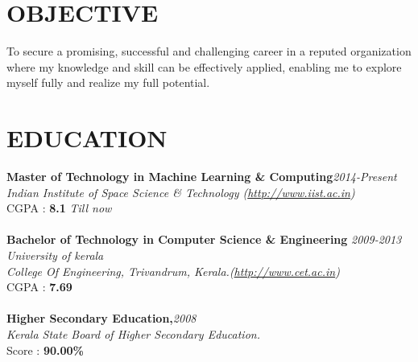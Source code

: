\documentclass[line,margin]{res}
\begin{document}
\address{\large akhilpm135@gmail.com}
\address{\large (+91) 9961558915}

\thispagestyle{empty} %

\begin{resume}
  
  	\section{OBJECTIVE}       
  		To secure a promising, successful and challenging career in a reputed organization where my knowledge and skill can be effectively applied, enabling me to explore myself fully and realize my full potential.
  
  	\section{EDUCATION} 
        {\bf Master of Technology in Machine Learning \& Computing}\hfill {\it 2014-Present}\\
        {\it Indian Institute of Space Science \& Technology \hfill(\url{http://www.iist.ac.in})} \\
        CGPA : {\bf 8.1} {\it Till now} \\\\           	  
        {\bf Bachelor of Technology in Computer Science \& Engineering}  \hfill {\it 2009-2013}\\
        {\it University of kerala} \\
        {\it College Of Engineering, Trivandrum, Kerala.\hfill(\url{http://www.cet.ac.in})} \\ 
        CGPA : {\bf 7.69} \\ \\
        {\bf Higher Secondary Education,}\hfill {\it 2008}\\        
        {\it Kerala State Board of Higher Secondary Education.}\\
        Score : {\bf 90.00\% }


\end{resume}
\end{document}
